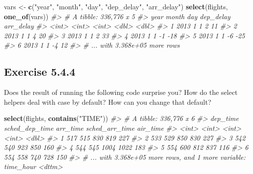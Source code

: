 \documentclass[]{book}
\newenvironment{Shaded}{\begin{snugshade}}{\end{snugshade}}
\newcommand{\CommentTok}[1]{\textcolor[rgb]{0.56,0.35,0.01}{\textit{#1}}}
\newcommand{\KeywordTok}[1]{\textcolor[rgb]{0.13,0.29,0.53}{\textbf{#1}}}
\newcommand{\NormalTok}[1]{#1}
\newcommand{\StringTok}[1]{\textcolor[rgb]{0.31,0.60,0.02}{#1}}
\theoremstyle{plain}
\theoremstyle{remark}
\begin{document}
\begin{Shaded}
\begin{Highlighting}[]
\NormalTok{vars <-}\StringTok{ }\KeywordTok{c}\NormalTok{(}\StringTok{"year"}\NormalTok{, }\StringTok{"month"}\NormalTok{, }\StringTok{"day"}\NormalTok{, }\StringTok{"dep_delay"}\NormalTok{, }\StringTok{"arr_delay"}\NormalTok{)}
\KeywordTok{select}\NormalTok{(flights, }\KeywordTok{one_of}\NormalTok{(vars))}
\CommentTok{#> # A tibble: 336,776 x 5}
\CommentTok{#>    year month   day dep_delay arr_delay}
\CommentTok{#>   <int> <int> <int>     <dbl>     <dbl>}
\CommentTok{#> 1  2013     1     1         2        11}
\CommentTok{#> 2  2013     1     1         4        20}
\CommentTok{#> 3  2013     1     1         2        33}
\CommentTok{#> 4  2013     1     1        -1       -18}
\CommentTok{#> 5  2013     1     1        -6       -25}
\CommentTok{#> 6  2013     1     1        -4        12}
\CommentTok{#> # ... with 3.368e+05 more rows}
\end{Highlighting}
\end{Shaded}

\hypertarget{exercise-5.4.4}{%
\subsection*{\texorpdfstring{Exercise
{5.4.4}}{Exercise 5.4.4}}\label{exercise-5.4.4}}

Does the result of running the following code surprise you? How do the
select helpers deal with case by default? How can you change that
default?

\begin{Shaded}
\begin{Highlighting}[]
\KeywordTok{select}\NormalTok{(flights, }\KeywordTok{contains}\NormalTok{(}\StringTok{"TIME"}\NormalTok{))}
\CommentTok{#> # A tibble: 336,776 x 6}
\CommentTok{#>   dep_time sched_dep_time arr_time sched_arr_time air_time}
\CommentTok{#>      <int>          <int>    <int>          <int>    <dbl>}
\CommentTok{#> 1      517            515      830            819      227}
\CommentTok{#> 2      533            529      850            830      227}
\CommentTok{#> 3      542            540      923            850      160}
\CommentTok{#> 4      544            545     1004           1022      183}
\CommentTok{#> 5      554            600      812            837      116}
\CommentTok{#> 6      554            558      740            728      150}
\CommentTok{#> # ... with 3.368e+05 more rows, and 1 more variable: time_hour <dttm>}
\end{Highlighting}
\end{Shaded}
\end{document}
